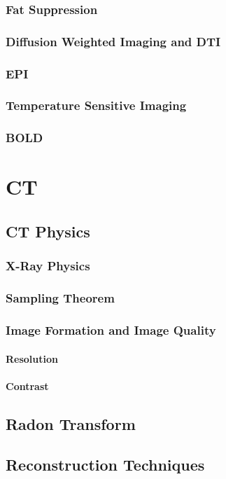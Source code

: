 \documentclass{book}
\begin{document}
				\section{Fat Suppression}
				\section{Diffusion Weighted Imaging and DTI}
				\section{EPI}
				\section{Temperature Sensitive Imaging}
				\section{BOLD}
		
		\part{CT}
			\chapter{CT Physics}
				\section{X-Ray Physics}
					
				\section{Sampling Theorem}
				\section{Image Formation and Image Quality}
					\subsection{Resolution}
					\subsection{Contrast}
			\chapter{Radon Transform}
			\chapter{Reconstruction Techniques}
\end{document}
